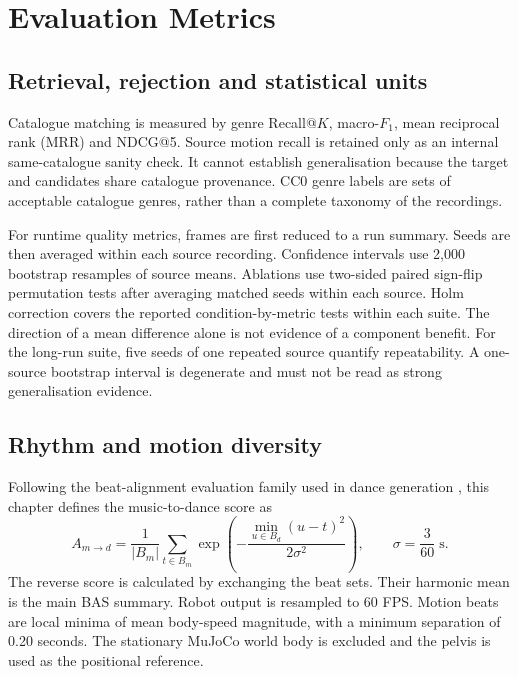 \section{Evaluation Metrics}

\subsection{Retrieval, rejection and statistical units}

Catalogue matching is measured by genre Recall@$K$, macro-$F_1$, mean
reciprocal rank (MRR) and NDCG@5. Source motion recall is retained only as an internal
same-catalogue sanity check. It cannot establish generalisation because the
target and candidates share catalogue provenance. CC0 genre labels are sets of
acceptable catalogue genres, rather than a complete taxonomy of the recordings.

For runtime quality metrics, frames are first reduced to a run summary. Seeds
are then averaged within each source recording. Confidence intervals use 2,000
bootstrap resamples of source means. Ablations use two-sided paired sign-flip
permutation tests after averaging matched seeds within each source. Holm
correction covers the reported condition-by-metric tests within each suite.
The direction of a mean difference alone is not evidence of a component benefit.
For the long-run suite, five seeds of one repeated source quantify repeatability. A one-source bootstrap interval is
degenerate and must not be read as strong generalisation evidence.

\subsection{Rhythm and motion diversity}

Following the beat-alignment evaluation family used in dance generation
\cite{li2021ai,siyao2022bailando}, this chapter defines the music-to-dance score as
\begin{equation}
 A_{m\rightarrow d} = \frac{1}{|B_m|}\sum_{t\in B_m}
 \exp\!\left(-\frac{\min_{u\in B_d}(u-t)^2}{2\sigma^2}\right),
 \qquad \sigma=\frac{3}{60}\;\mathrm{s}.
\end{equation}
The reverse score is calculated by exchanging the beat sets. Their harmonic
mean is the main BAS summary. Robot output is resampled to 60 FPS. Motion beats
are local minima of mean body-speed magnitude, with a minimum separation of
0.20 seconds. The stationary MuJoCo world body is excluded and the pelvis is
used as the positional reference.

